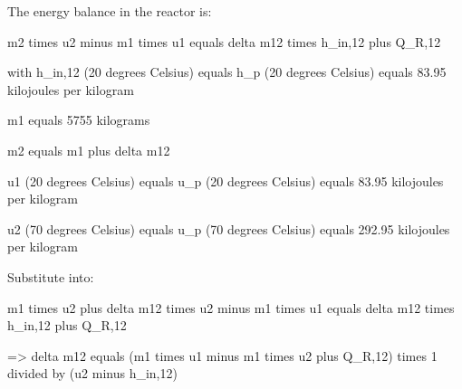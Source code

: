 The energy balance in the reactor is:  

m2 times u2 minus m1 times u1 equals delta m12 times h_in,12 plus Q_R,12  

with h_in,12 (20 degrees Celsius) equals h_p (20 degrees Celsius) equals 83.95 kilojoules per kilogram  

m1 equals 5755 kilograms  

m2 equals m1 plus delta m12  

u1 (20 degrees Celsius) equals u_p (20 degrees Celsius) equals 83.95 kilojoules per kilogram  

u2 (70 degrees Celsius) equals u_p (70 degrees Celsius) equals 292.95 kilojoules per kilogram  

Substitute into:  

m1 times u2 plus delta m12 times u2 minus m1 times u1 equals delta m12 times h_in,12 plus Q_R,12  

=> delta m12 equals (m1 times u1 minus m1 times u2 plus Q_R,12) times 1 divided by (u2 minus h_in,12)